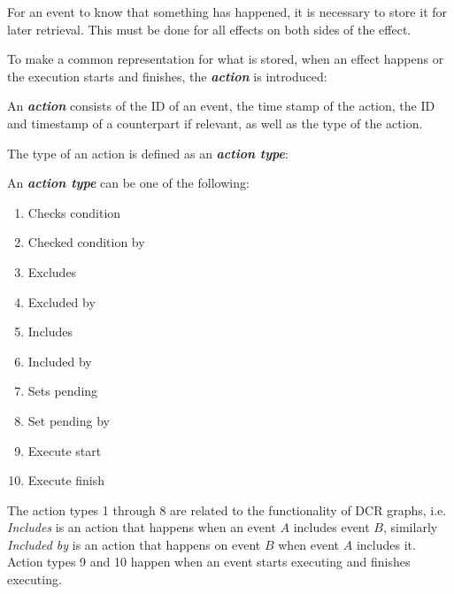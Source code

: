 	\newpar For an event to know that something has happened, it is necessary to store it for later retrieval. This must be done for all effects on both sides of the effect.
	
	\newpar To make a common representation for what is stored, when an effect happens or the execution starts and finishes, the \textbf{\textit{action}} is introduced:
	
	\begin{definition}
		An \textit{\textbf{action}} consists of the ID of an event, the time stamp of the action, the ID and timestamp of a counterpart if relevant, as well as the type of the action.
	\end{definition}
	
	\newpar	The type of an action is defined as an \textit{\textbf{action type}}:
	
	\begin{definition}
        \label{def:actiontype}
		An \textit{\textbf{action type}} can be one of the following:
		\begin{multicols}{3}
			\begin{enumerate}
	            \item Checks condition\label{actiontype:checkscondition}
				\item Checked condition by\label{actiontype:checkedconditionby}
				\item Excludes\label{actiontype:excludes}
				\item Excluded by\label{actiontype:excludedby}
				\item Includes\label{actiontype:includes}
				\item Included by\label{actiontype:includedby}
				\item Sets pending\label{actiontype:setspending}
				\item Set pending by\label{actiontype:setpendingby}
				\item Execute start
				\item Execute finish
			\end{enumerate}
		\end{multicols}
	\end{definition}
	
	\newpar The action types 1 through 8 are related to the functionality of DCR graphs, i.e. \textit{Includes} is an action that happens when an event $A$ includes event $B$, similarly \textit{Included by} is an action that happens on event $B$ when event $A$ includes it. Action types 9 and 10 happen when an event starts executing and finishes executing.
    
